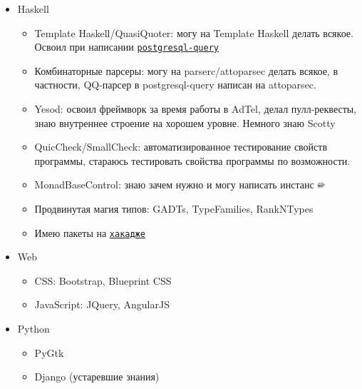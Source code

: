 \documentclass[11pt,a4paper,sans]{moderncv}        %
\newcommand*{\nlink}[2]{\textcolor{blue}{\texttt{\underline{\href{#1}{#2}}}}}
\begin{document}
\begin{itemize}
\item Haskell
  \begin{itemize}
  \item Template Haskell/QuasiQuoter: могу на Template Haskell
    делать всякое. Освоил при написании
    \nlink{http://hackage.haskell.org/package/postgresql-query}{postgresql-query}
  \item Комбинаторные парсеры: могу на parserc/attoparsec делать
    всякое, в частности, QQ-парсер в \hbox{postgresql-query} написан на
    \hbox{attoparsec}.
  \item Yesod: освоил фреймворк за время работы в AdTel, делал
    пулл-реквесты, знаю внутреннее строение на хорошем уровне. Немного
    знаю Scotty
  \item QuicCheck/SmallCheck: автоматизированное тестирование
    свойств программы, стараюсь тестировать свойства программы по
    возможности.
  \item MonadBaseControl: знаю зачем нужно и могу написать инстанс \includegraphics[height=0.7em]{Trollface_HD}
  \item Продвинутая магия типов: GADTs, TypeFamilies, RankNTypes
  \item Имею пакеты на \nlink{http://hackage.haskell.org/user/AlekseyUymanov}{хакадже}
  \end{itemize}
\item Web
  \begin{itemize}
  \item CSS: Bootstrap, Blueprint CSS
  \item JavaScript: JQuery, AngularJS
  \end{itemize}
\item Python
  \begin{itemize}
  \item PyGtk
  \item Django (устаревшие знания)
  \end{itemize}



\end{itemize}
\end{document}
